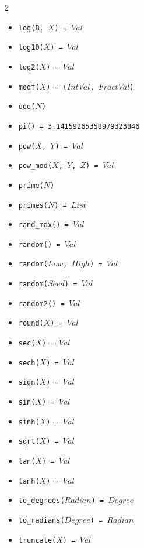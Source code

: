 \documentclass[10pt]{article}
\begin{document}
\begin{multicols}{2}
\begin{scriptsize}
\begin{itemize}
   \item \texttt{log(B, $X$) = $Val$} 
   \item \texttt{log10($X$) = $Val$} 
   \item \texttt{log2($X$) = $Val$} 
   \item \texttt{modf($X$) = ($IntVal$, $FractVal$)} 
   \item \texttt{odd($N$)} 
   \item \texttt{pi() = 3.14159265358979323846} 
   \item \texttt{pow($X$, $Y$) = $Val$}
   \item \texttt{pow\_mod($X$, $Y$, $Z$) = $Val$}
   \item \texttt{prime($N$)} 
   \item \texttt{primes($N$) = $List$} 
   \item \texttt{rand\_max() = $Val$} 
   \item \texttt{random() = $Val$} 
   \item \texttt{random($Low$, $High$) = $Val$} 
   \item \texttt{random($Seed$) = $Val$} 
   \item \texttt{random2() = $Val$} 
   \item \texttt{round($X$) = $Val$}
   \item \texttt{sec($X$) = $Val$}
   \item \texttt{sech($X$) = $Val$} 
   \item \texttt{sign($X$) = $Val$}  
   \item \texttt{sin($X$) = $Val$} 
   \item \texttt{sinh($X$) = $Val$} 
   \item \texttt{sqrt($X$) = $Val$} 
   \item \texttt{tan($X$) = $Val$}
   \item \texttt{tanh($X$) = $Val$} 
   \item \texttt{to\_degrees($Radian$) = $Degree$} 
   \item \texttt{to\_radians($Degree$) = $Radian$}
   \item \texttt{truncate($X$) = $Val$}  

\end{itemize}
\end{scriptsize}
\end{multicols}
\end{document}
